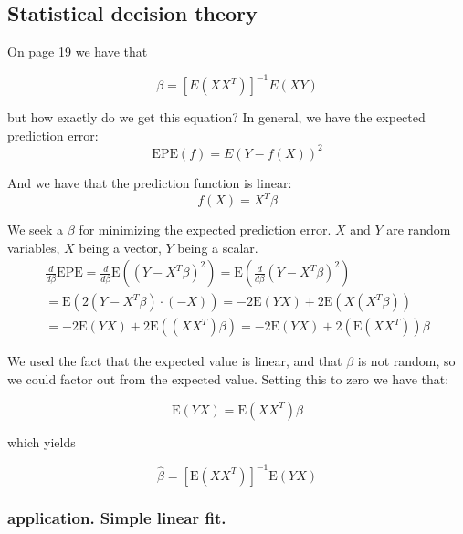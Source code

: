 \documentclass{article}
\begin{document}
\newpage
\subsection{Statistical decision theory} \label{linear_fit}

On page 19 we have that

\begin{equation}
    \beta = [E(XX^T)]^{-1}E(XY)
\end{equation}

but how exactly do we get this equation? In general, we have the expected prediction error:
\begin{equation}
    \text{EPE}(f) = E(Y-f(X))^2
\end{equation}

And we have that the prediction function is linear:
\begin{equation}
    f(X) = X^T\beta
\end{equation}

We seek a $\beta$ for minimizing the expected prediction error. $X$ and $Y$ are random variables, $X$ being a vector, $Y$ being a scalar. 
\begin{equation}
    \begin{split}
        \frac{d}{d\beta}\text{EPE} = \frac{d}{d\beta} \text{E}((Y-X^T\beta)^2) = \text{E}\left( \frac{d}{d\beta} (Y-X^T\beta)^2\right)\\
        =\text{E} \left( 2(Y - X^T\beta)\cdot (-X) \right) = -2 \text{E} (YX) + 2 \text{E} (X(X^T\beta))\\
         = -2 \text{E} (YX) + 2 \text{E} ((XX^T)\beta) = -2 \text{E} (YX) + 2 (\text{E} (XX^T))\beta
    \end{split}
\end{equation}

We used the fact that the expected value is linear, and that $\beta$ is not random, so we could factor out from the expected value. Setting this to zero we have that:

\begin{equation}
    \text{E} (YX) = \text{E} (XX^T)\beta
\end{equation}

which yields

\begin{equation}
    \hat{\beta} = [\text{E} (XX^T)]^{-1} \text{E} (YX)
\end{equation}

\subsubsection{application. Simple linear fit.}
\end{document}
